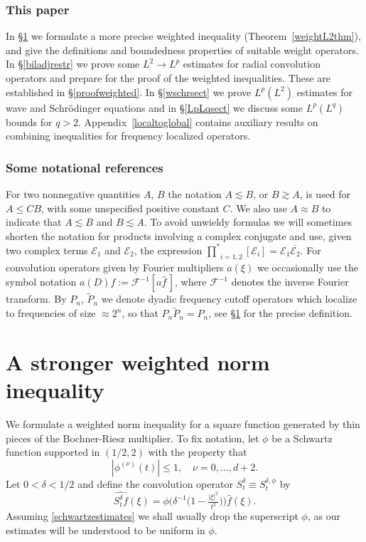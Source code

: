 \documentclass[11pt]{amsart}
\theoremstyle{definition}
\numberwithin{theorem}{section}
\numberwithin{definition}{section}
\def\prodstartext{{\prod^{*}}_{\!\!i=1,2}}
\newcommand{\Be}{\begin{equation}}
\newcommand{\Ee}{\end{equation}}
\newcommand{\note}[1]{\footnote{\texttt{\Small #1}}}
\def\lc{\lesssim}
\def\gc{\gtrsim}
\def\cE{{\mathcal {E}}}
\def\cF{{\mathcal {F}}}
\begin{document}
\subsubsection*{This paper}
In \S\ref{defofW} we formulate a more precise weighted inequality (Theorem~\ref{weightL2thm}), and give the  definitions and boundedness properties
 of suitable weight operators.
 In \S\ref{biladjrestr} we prove some $L^2\to L^p$
estimates for radial convolution operators and prepare for the proof
of the  weighted inequalities. These are established in
\S\ref{proofweighted}. In \S\ref{wschrsect} we prove $L^p(L^2)$
estimates for wave and Schr\"odinger equations and in
\S\ref{LpLqsect} we discuss some $L^p(L^q)$ bounds for $q>2$.
Appendix~\ref{localtoglobal} contains  auxiliary results on
combining inequalities for frequency localized operators.

\subsubsection*{Some notational references}
For two nonnegative quantities $A$, $B$ the notation  $A\lc B$, or
 $B\gc A$,  is used for $A\le CB$, with  some unspecified positive constant $C$.
We also use $A\approx B$ to indicate that $A\lc B$ and $B\lc A$.
To avoid unwieldy formulas we will
sometimes shorten the notation for   products involving a complex conjugate and use, given two complex  terms  $\cE_1$ and $\cE_2$,   the expression
$\prodstartext[\cE_i] = \cE_1\overline{\cE_2}.$
For convolution operators given by Fourier multipliers $a(\xi)$ we occasionally use
the symbol notation
$a(D)f:=  \cF^{-1}[a\widehat f \,]$, where $\cF^{-1}$ denotes the inverse Fourier transform.
By $P_n$, $\widetilde P_n$  we denote dyadic frequency cutoff operators
which  localize to
frequencies of size $\approx 2^n$, so that $P_n\widetilde P_n=P_n$,  see
\S\ref{defofW} for the precise definition.



\section{A stronger weighted norm inequality}\label{defofW}
We formulate a  weighted  norm inequality for a square function
generated  by thin pieces of the Bochner-Riesz multiplier.
To fix notation,
let $\phi$ be a Schwartz function supported in $(1/2,2)$ with the property that
\Be\label{schwartzestimates}
|\phi^{(\nu)}(t)|\le 1 , \quad \nu=0,\dots, d+2. \Ee
Let $0<\delta< 1/2$ and define the convolution operator $S^{\delta}_t\equiv S^{\delta,\phi}_t$ by
\Be \label{Sdeltat}\widehat{S^\delta_t f}(\xi)= \phi\big(\delta^{-1}\big(1-\tfrac{|\xi|^2}{t^2}\big)\big)\widehat f(\xi).
\Ee
Assuming \eqref{schwartzestimates} we shall usually drop the
superscript $\phi$,
as our estimates will be understood to be uniform in  $\phi$.
\end{document}
